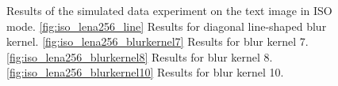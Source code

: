 \documentclass[12pt,notitlepage]{report}
\begin{document}
\clearpage

\begin{figure}[htb]
  \centering

  \caption[Results for the text image in ISO mode]{Results of the simulated data experiment on the text image in ISO mode. \ref{fig:iso_lena256_line} Results for diagonal line-shaped blur kernel. \ref{fig:iso_lena256_blurkernel7} Results for blur kernel 7. \ref{fig:iso_lena256_blurkernel8} Results for blur kernel 8. \ref{fig:iso_lena256_blurkernel10} Results for blur kernel 10.}
  \label{fig:iso_text256}
\end{figure}
\end{document}
